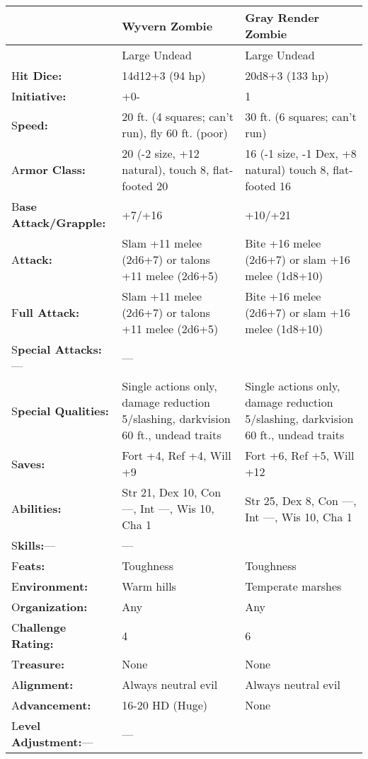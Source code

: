 \documentclass{article}
\begin{document}
\vspace{12pt}
\begin{tabular}{|>{\raggedright}p{55pt}|>{\raggedright}p{129pt}|>{\raggedright}p{129pt}|}
\hline
  & W\textbf{yvern Zombie} & G\textbf{ray Render Zombie}\tabularnewline
\hline
  & Large Undead & Large Undead\tabularnewline
\hline
H\textbf{it Dice:} & 14d12+3 (94 hp) & 20d8+3 (133 hp)\tabularnewline
\hline
I\textbf{nitiative:} & +0- & 1\tabularnewline
\hline
S\textbf{peed:} & 20 ft. (4 squares; can't run), fly 60 ft. (poor) & 30 ft. (6 
squares; can't run)\tabularnewline
\hline
A\textbf{rmor Class:} & 20 (-2 size, +12 natural), touch 8, flat-footed 20 & 16 
(-1 size, -1 Dex, +8 natural) touch 8, flat-footed 16\tabularnewline
\hline
B\textbf{ase Attack/Grapple:} & +7/+16 & +10/+21\tabularnewline
\hline
A\textbf{ttack:} & Slam +11 melee (2d6+7) or talons +11 melee (2d6+5) & Bite +16 
melee (2d6+7) or slam +16 melee (1d8+10)\tabularnewline
\hline
F\textbf{ull Attack:} & Slam +11 melee (2d6+7) or talons +11 melee (2d6+5) & Bite 
+16 melee (2d6+7) or slam +16 melee (1d8+10)\tabularnewline
\hline
S\textbf{pecial Attacks:}--- & --- & \tabularnewline
\hline
S\textbf{pecial Qualities:} & Single actions only, damage reduction 5/slashing, 
darkvision 60 ft., undead traits & Single actions only, damage reduction 5/slashing, 
darkvision 60 ft., undead traits\tabularnewline
\hline
S\textbf{aves:} & Fort +4, Ref +4, Will +9 & Fort +6, Ref +5, Will +12\tabularnewline
\hline
A\textbf{bilities:} & Str 21, Dex 10, Con ---, Int ---, Wis 10, Cha 1 & Str 25, 
Dex 8, Con ---, Int ---, Wis 10, Cha 1\tabularnewline
\hline
S\textbf{kills:}--- & --- & \tabularnewline
\hline
F\textbf{eats:} & Toughness & Toughness\tabularnewline
\hline
E\textbf{nvironment:} & Warm hills & Temperate marshes\tabularnewline
\hline
O\textbf{rganization:} & Any & Any\tabularnewline
\hline
C\textbf{hallenge Rating:} & 4 & 6\tabularnewline
\hline
T\textbf{reasure:} & None & None\tabularnewline
\hline
A\textbf{lignment:} & Always neutral evil & Always neutral evil\tabularnewline
\hline
A\textbf{dvancement:} & 16-20 HD (Huge) & None\tabularnewline
\hline
L\textbf{evel Adjustment:}--- & --- & \tabularnewline
\hline
\end{tabular}

\newpage
\end{document}
